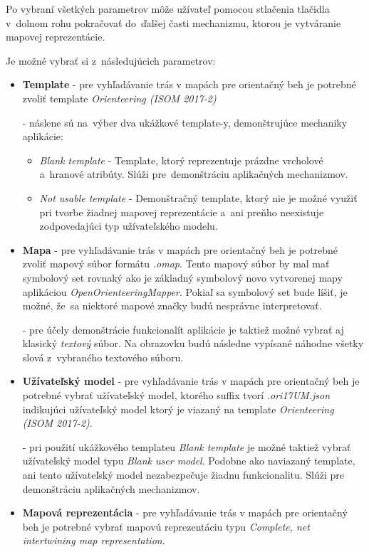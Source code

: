 \documentclass[12pt,a4paper]{report}
\begin{document}
Po vybraní všetkých parametrov môže užívateľ pomocou stlačenia tlačidla v~dolnom rohu pokračovať do~ďalšej časti mechanizmu, ktorou je vytváranie mapovej reprezentácie.

Je možné vybrať si z~následujúcich parametrov:
\begin{itemize}
    \item \textbf{Template} - pre vyhľadávanie trás v mapách pre orientačný beh je potrebné zvoliť template \textit{Orienteering (ISOM 2017-2)} 

    - náslene sú na~výber dva ukážkové template-y, demonštrujúce mechaniky aplikácie:
    \begin{itemize}
        \item \textit{Blank template} - Template, ktorý reprezentuje prázdne vrcholové a~hranové atribúty. Slúži pre~demonštráciu aplikačných mechanizmov.
        \item \textit{Not usable template} - Demonštračný template, ktorý nie je možné využiť pri tvorbe žiadnej mapovej reprezentácie a~ani preňho neexistuje zodpovedajúci typ užívateľského modelu.
    \end{itemize}
    \item \textbf{Mapa} - pre vyhľadávanie trás v mapách pre orientačný beh je potrebné zvoliť mapový súbor formátu \textit{.omap}. Tento mapový súbor by mal mať symbolový set rovnaký ako je základný symbolový novo vytvorenej mapy aplikáciou \textit{OpenOrienteeringMapper}. Pokiaľ sa symbolový set bude líšiť, je možné, že~sa niektoré mapové značky budú nesprávne interpretovať.
    
    - pre účely demonštrácie funkcionalít aplikácie je taktiež možné vybrať aj klasický \textit{textový} súbor. Na obrazovku budú následne vypísané náhodne všetky slová z~vybraného textového súboru.
    \item \textbf{Užívateľský model} - pre vyhľadávanie trás v mapách pre orientačný beh je potrebné vybrať užívateľský model, ktorého suffix tvorí \textit{.ori17UM.json} indikujúci užívateľský model ktorý je viazaný na template \textit{Orienteering (ISOM 2017-2)}. 
    
    - pri použití ukážkového templateu \textit{Blank template} je možné taktiež vybrať užívateľský model typu \textit{Blank user model}. Podobne ako naviazaný template, ani tento užívateľský model nezabezpečuje žiadnu funkcionalitu. Slúži pre demonštráciu aplikačných mechanizmov.
    \item \textbf{Mapová reprezentácia} - pre vyhľadávanie trás v mapách pre orientačný beh je potrebné vybrať mapovú reprezentáciu typu \textit{Complete, net intertwining map representation}.


\end{itemize}
\end{document}
